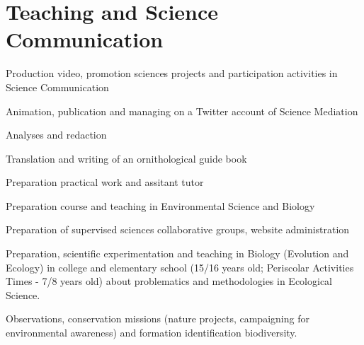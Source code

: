 \documentclass[11.5pt,a4paper]{moderncv}
\begin{document}
\section {Teaching and Science Communication}
{Production video, promotion sciences projects and participation activities in Science Communication}

{Animation, publication and managing on a Twitter account of Science Mediation}

{Analyses and redaction} 

{Translation and writing of an ornithological guide book} 

{Preparation practical work and assitant tutor}

{Preparation course and teaching in Environmental Science and Biology}

{Preparation of supervised sciences collaborative groups, website administration}

{Preparation, scientific experimentation and teaching in Biology (Evolution and Ecology) in college and elementary school (15/16 years old; Periscolar Activities Times - 7/8 years old) about problematics and methodologies in Ecological Science.}

{Observations,  conservation missions (nature projects, campaigning for environmental awareness) and formation identification biodiversity.}

\end{document}
